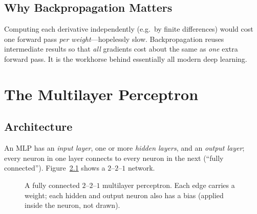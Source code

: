 \documentclass[11pt,a4paper]{report}
\theoremstyle{definition}
\theoremstyle{remark}
\begin{document}
\section{Why Backpropagation Matters}
Computing each derivative independently (e.g.\ by finite differences) would cost
one forward pass \emph{per weight}---hopelessly slow. Backpropagation reuses
intermediate results so that \emph{all} gradients cost about the same as
\emph{one} extra forward pass. It is the workhorse behind essentially all modern
deep learning.

\chapter{The Multilayer Perceptron}
\label{ch:mlp}

\section{Architecture}
An MLP has an \emph{input layer}, one or more \emph{hidden layers}, and an
\emph{output layer}; every neuron in one layer connects to every neuron in the
next (``fully connected''). Figure~\ref{fig:mlp} shows a $2$--$2$--$1$ network.

\begin{figure}[ht]
\centering
{}
\caption{A fully connected $2$--$2$--$1$ multilayer perceptron. Each edge carries
a weight; each hidden and output neuron also has a bias (applied inside the
neuron, not drawn).}
\label{fig:mlp}
\end{figure}
\end{document}
